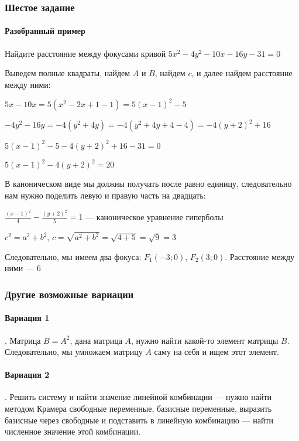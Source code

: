 \documentclass{article}
\begin{document}
\begin{flushleft}
\pagebreak
\subsubsection{Шестое задание}

\paragraph{Разобранный пример}

Найдите расстояние между фокусами кривой $5x^2 - 4y^2 - 10x - 16y - 31 = 0$

Выведем полные квадраты, найдем $A$ и $B$, найдем $c$, и далее найдем расстояние между ними:

\bigskip

$5x - 10x = 5(x^2 - 2x + 1 - 1) = 5(x-1)^2 - 5$

$-4y^2 - 16y = -4(y^2 + 4y) = -4(y^2 + 4y + 4 - 4) = -4(y + 2)^2 + 16$

$5 (x - 1)^2 - 5 - 4(y + 2)^2 + 16 - 31 = 0$

$5 (x - 1)^2 - 4(y + 2)^2 = 20$

В каноническом виде мы должны получать после равно единицу, следовательно нам нужно поделить левую и правую часть на двадцать:

$\frac{(x - 1)^2}{4} - \frac{(y+2)^2}{5} = 1$ — каноническое уравнение гиперболы

$c^2 = a^2 + b^2$, $c = \sqrt{a^2 + b^2} = \sqrt{4 + 5} = \sqrt{9} = 3$

\bigskip

Следовательно, мы имеем два фокуса: $F_1(-3; 0)$, $F_2(3; 0)$. Расстояние между ними — 6

\pagebreak
\subsubsection{Другие возможные вариации}

\paragraph{Вариация 1}. Матрица $B = A^2$, дана матрица $A$, нужно найти какой-то элемент матрицы $B$. Следовательно, мы умножаем матрицу $A$ саму на себя и ищем этот элемент.

\paragraph{Вариация 2}. Решить систему и найти значение линейной комбинации — нужно найти методом Крамера свободные переменные, базисные переменные, выразить базисные через свободные и подставить в линейную комбинацию — найти численное значение этой комбинации.


\end{flushleft}
\end{document}
